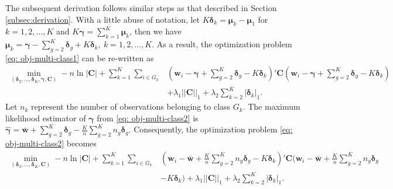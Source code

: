 \documentclass[12pt]{article}
\begin{document}
The subsequent derivation follows similar steps as that described in Section \ref{subsec:derivation}.
With a little abuse of notation, let $K \bm \delta_k = \bm \mu_k - \bm \mu_1$ for $k = 1, 2, \ldots, K$ and $K \bm \gamma = \sum_{k=1}^{K} \bm \mu_k$, then we have $\bm \mu_{k} = \bm \gamma - \sum_{g=2}^{K} \bm \delta_g + K \bm \delta_k, ~ k = 1, 2, \ldots, K$.
As a result, the optimization problem \eqref{eq: obj-multi-class1} can be re-written as
\begin{align}\label{eq: obj-multi-class2}
\min_{(\bm \delta_2, \ldots, \bm \delta_K, \bm \gamma, \bm C)} -n \ln|\bm C| + \sum_{k=1}^{K} \sum_{i\in G_k} &(\bm w_i - \bm \gamma + \sum_{g=2}^{K} \bm \delta_g - K \bm \delta_k)' \bm C (\bm w_i - \bm \gamma + \sum_{g=2}^{K} \bm \delta_g - K \bm \delta_k) \nonumber \\
&+ \lambda_1||\bm C||_1 + \lambda_2 \sum_{k=2}^{K} | \bm \delta_k |_1.
\end{align}
Let $n_k$ represent the number of observations belonging to class $G_k$.
The maximum likelihood estimator of $\bm \gamma$ from \eqref{eq: obj-multi-class2} is $\hat{\bm \gamma} = \bar{\bm w} + \sum_{g=2}^{K} \bm \delta_g - \frac{K}{n} \sum_{g=2}^{K} n_g \bm \delta_g$.
Consequently, the optimization problem \eqref{eq: obj-multi-class2} becomes
\begin{align}\label{eq: obj-multi-class3}
\min_{(\bm \delta_2, \ldots, \bm \delta_K, \bm C)} -n \ln|\bm C| + \sum_{k=1}^{K} \sum_{i\in G_k} &(\bm w_i - \bar{\bm w} + \frac{K}{n} \sum_{g=2}^{K} n_g \bm \delta_g - K \bm \delta_k)' \bm C (\bm w_i - \bar{\bm w} + \frac{K}{n} \sum_{g=2}^{K} n_g \bm \delta_g        \nonumber \\
& - K \bm \delta_k) + \lambda_1||\bm C||_1 + \lambda_2 \sum_{k=2}^{K} | \bm \delta_k |_1.
\end{align}
\end{document}
